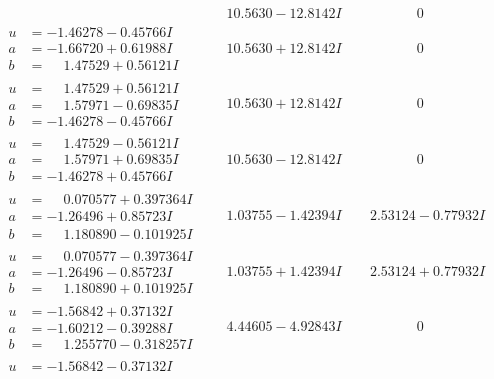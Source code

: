 \documentclass[1p]{elsarticle_modified}
\theoremstyle{definition}
\begin{document}
$$\begin{array}{c|c|c}
 & \phantom{-}10.5630 - 12.8142 I & \phantom{-0.000000 } 0 \\ \hline\begin{aligned}
u &= -1.46278 - 0.45766 I \\
a &= -1.66720 + 0.61988 I \\
b &= \phantom{-}1.47529 + 0.56121 I\end{aligned}
 & \phantom{-}10.5630 + 12.8142 I & \phantom{-0.000000 } 0 \\ \hline\begin{aligned}
u &= \phantom{-}1.47529 + 0.56121 I \\
a &= \phantom{-}1.57971 - 0.69835 I \\
b &= -1.46278 - 0.45766 I\end{aligned}
 & \phantom{-}10.5630 + 12.8142 I & \phantom{-0.000000 } 0 \\ \hline\begin{aligned}
u &= \phantom{-}1.47529 - 0.56121 I \\
a &= \phantom{-}1.57971 + 0.69835 I \\
b &= -1.46278 + 0.45766 I\end{aligned}
 & \phantom{-}10.5630 - 12.8142 I & \phantom{-0.000000 } 0 \\ \hline\begin{aligned}
u &= \phantom{-}0.070577 + 0.397364 I \\
a &= -1.26496 + 0.85723 I \\
b &= \phantom{-}1.180890 - 0.101925 I\end{aligned}
 & \phantom{-}1.03755 - 1.42394 I & \phantom{-}2.53124 - 0.77932 I \\ \hline\begin{aligned}
u &= \phantom{-}0.070577 - 0.397364 I \\
a &= -1.26496 - 0.85723 I \\
b &= \phantom{-}1.180890 + 0.101925 I\end{aligned}
 & \phantom{-}1.03755 + 1.42394 I & \phantom{-}2.53124 + 0.77932 I \\ \hline\begin{aligned}
u &= -1.56842 + 0.37132 I \\
a &= -1.60212 - 0.39288 I \\
b &= \phantom{-}1.255770 - 0.318257 I\end{aligned}
 & \phantom{-}4.44605 - 4.92843 I & \phantom{-0.000000 } 0 \\ \hline\begin{aligned}
u &= -1.56842 - 0.37132 I \\

\end{aligned}
\end{array}$$
\end{document}

